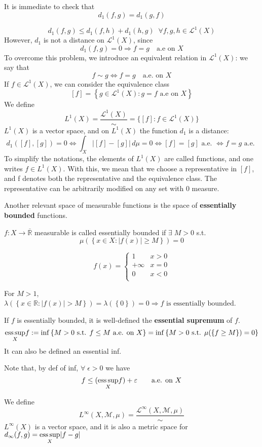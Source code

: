 It is immediate to check that 
\[
    d_1 (f, g) = d_1(g, f) \tag*{(symmetry)}
\]  

\[
    d_1(f, g) \leq d_1(f, h) + d_1(h, g) \; \;\forall f, g, h \in \mathcal{L}^1(X) \tag*{(triangular inequality)}
\]  
However, \(d_1\) is not a distance on \(\mathcal{L}^1(X)\), since 
\[
    d_1(f,g) = 0 \Rightarrow f=g \quad \mbox{a.e on }X
\tag*{(pseudo-distance)}\]
To overcome this problem, we introduce an equivalent relation in \(\mathcal{L}^1(X)\): we say that 
\[
    f \sim g \Leftrightarrow f = g \quad \mbox{a.e. on }X
\]
If \(f \in \mathcal{L}^1(X)\), we can consider the equivalence class
\[
    [f] = \left\lbrace g \in \mathcal{L}^1(X) : g = f \mbox{ a.e on }X \right\rbrace
\]
We define
\[
    L^1(X) = \frac{\mathcal{L}^1(X)}{\sim} = \{[f]: f \in \mathcal{L}^1(X)\}
\]
\(L^1(X)\) is a vector space, and on \(L^1(X)\) the function \(d_1\) is a distance: 
\[
    d_1([f], [g]) = 0 \Leftrightarrow \int_X |[f]-[g]|\, d\mu =0 \Leftrightarrow [f]= [g] \text{ a.e. } \Leftrightarrow f=g \text{ a.e. }
\]
To simplify the notations, the elements of \(L^1(X)\) are called functions, and one writes \(f \in L^1(X)\). With this, we mean that we choose a representative in \([f]\), and f denotes both the representative and the equivalence class. The representative can be arbitrarily modified on any set with \(0\) measure.

Another relevant space of measurable functions is the space of \textbf{essentially bounded} functions.
\begin{definition}
    \(f : X \to \overline{\mathbb{R}}\) measurable is called essentially bounded if \(\exists \; M > 0\) s.t.
    \[
        \mu(\left\lbrace x \in X : \vert f(x) \vert \geq M \right\rbrace) = 0
    \]
\end{definition}
\begin{example}
    \[f(x) = \begin{cases}
        1 & x > 0 \\
    +\infty & x = 0 \\
    0 & x < 0 \\
    \end{cases}
    \]
\end{example} 
For \(M > 1\), \(\lambda(\left\lbrace x \in \mathbb{R} : \vert f(x) \vert > M\right\rbrace) = \lambda(\left\lbrace 0 \right\rbrace) = 0 \Rightarrow f\mbox{ is essentially bounded}\).


If \(f\) is essentially bounded, it is well-defined the \textbf{essential supremum} of \(f\).
\[
    \underset{X}{\text{ess}\, \text{sup}} f := \inf \left\lbrace M > 0 \mbox{ s.t. } f \leq M \mbox{ a.e. on }X\right\rbrace = \inf \left\lbrace M > 0 \mbox{ s.t. } \mu(\{f \geq M \})=0 \right\rbrace
\]
It can also be defined an essential inf.
\begin{remark}
    Note that, by def of inf, \(\forall \; \epsilon > 0\) we have 
    \[
        f \leq (\underset{X}{\text{ess}\, \text{sup}} f) + \varepsilon \qquad \text{a.e. on }X
    \]
\end{remark}
We define 
\[
    L^{\infty} (X, \mathcal{M}, \mu) = \frac{\mathcal{L}^{\infty}(X, \mathcal{M}, \mu)}{\sim}
\]
\(L^{\infty}(X)\) is a vector space, and it is also a metric space for \(d_{\infty}(f,g) = \underset{X}{\text{ess}\, \text{sup}} \vert f-g \vert\)